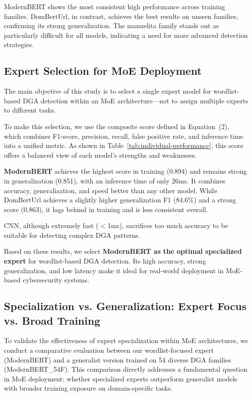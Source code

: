 \documentclass[a4paper]{llncs}
\begin{document}
ModernBERT shows the most consistent high performance across training families. DomBertUrl, in contrast, achieves the best results on unseen families, confirming its strong generalization. The manuelita family stands out as particularly difficult for all models, indicating a need for more advanced detection strategies.

\subsection{Expert Selection for MoE Deployment}

The main objective of this study is to select a single expert model for wordlist-based DGA detection within an MoE architecture—not to assign multiple experts to different tasks.

To make this selection, we use the composite score defined in Equation~(2), which combines F1-score, precision, recall, false positive rate, and inference time into a unified metric. As shown in Table~\ref{tab:individual-performance}, this score offers a balanced view of each model’s strengths and weaknesses.

\textbf{ModernBERT} achieves the highest score in training (0.894) and remains strong in generalization (0.851), with an inference time of only 26ms. It combines accuracy, generalization, and speed better than any other model. While DomBertUrl achieves a slightly higher generalization F1 (84.6\%) and a strong score (0.863), it lags behind in training and is less consistent overall.

CNN, although extremely fast ($<$1ms), sacrifices too much accuracy to be suitable for detecting complex DGA patterns.

Based on these results, we select \textbf{ModernBERT as the optimal specialized expert} for wordlist-based DGA detection. Its high accuracy, strong generalization, and low latency make it ideal for real-world deployment in MoE-based cybersecurity systems.


\subsection{Specialization vs. Generalization: Expert Focus vs. Broad Training}

To validate the effectiveness of expert specialization within MoE architectures, we conduct a comparative evaluation between our wordlist-focused expert (ModernBERT) and a generalist version trained on 54 diverse DGA families (ModernBERT\_54F). This comparison directly addresses a fundamental question in MoE deployment: whether specialized experts outperform generalist models with broader training exposure on domain-specific tasks.
\end{document}
